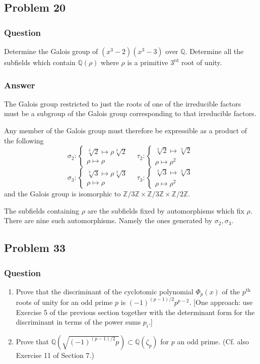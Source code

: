 \documentclass[10pt]{article}
\begin{document}
\subsection{Problem 20}
\subsubsection{Question}
Determine the Galois group of $(x^3-2)(x^3-3)$ over $\mathbb{Q}$. Determine all the subfields which contain $\mathbb{Q}(\rho)$ where $\rho$ is a primitive $3^\mathrm{rd}$ root of unity.
\subsubsection{Answer}
The Galois group restricted to just the roots of one of the irreducible factors must be a subgroup of the Galois group corresponding to that irreducible factors. 

Any member of the Galois group must therefore be expressible as a product of the following
\[ \sigma_2 : \left\{ \begin{array}{c}  \sqrt[3]2 \mapsto \rho \sqrt[3]2 \\ \rho \mapsto \rho \end{array} \right. \quad \tau_2:  \left\{ \begin{array}{c} \sqrt[3]2 \mapsto \sqrt[3]2 \\ \rho \mapsto \rho^2 \end{array} \right.  \]
\[ \sigma_3 : \left\{ \begin{array}{c}  \sqrt[3]3 \mapsto \rho \sqrt[3]3 \\ \rho \mapsto \rho \end{array} \right. \quad \tau_3:  \left\{ \begin{array}{c} \sqrt[3]3 \mapsto \sqrt[3]3 \\ \rho \mapsto \rho^2 \end{array} \right.  \]
and the Galois group is isomorphic to $\mathbb{Z}/3\mathbb{Z}\times\mathbb{Z}/3\mathbb{Z}\times\mathbb{Z}/2\mathbb{Z}$.

The subfields containing $\rho$ are the subfields fixed by automorphisms which fix $\rho$. There are nine such automorphisms. Namely the ones generated by $\sigma_2, \sigma_3$.
\subsection{Problem 33}
\subsubsection{Question}
\begin{enumerate}
\item Prove that the discriminant of the cyclotomic polynomial $\Phi_p(x)$ of the $p^\mathrm{th}$ roots of unity for an odd prime $p$ is $(-1)^{(p-1)/2}p^{p-2}$. [One approach: use Exercise 5 of the previous section together with the determinant form for the discriminant  in terms of the power sums $p_i$.]
\item Prove that $\mathbb{Q}(\sqrt{(-1)^{(p-1)/ 2}p})\subset \mathbb{Q}(\zeta_p)$ for $p$ an odd prime. (Cf. also Exercise 11 of Section 7.)
\end{enumerate}
\end{document}
